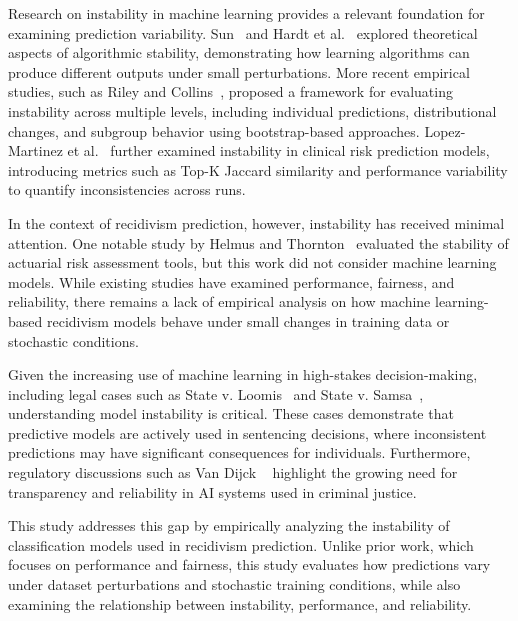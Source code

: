 \documentclass[12pt]{article}
\begin{document}
Research on instability in machine learning provides a relevant foundation for examining prediction variability. Sun~\cite{sun2015stability} and Hardt et al.~\cite{hardt2016train} explored theoretical aspects of algorithmic stability, demonstrating how learning algorithms can produce different outputs under small perturbations. More recent empirical studies, such as Riley and Collins~\cite{riley2023stability}, proposed a framework for evaluating instability across multiple levels, including individual predictions, distributional changes, and subgroup behavior using bootstrap-based approaches. Lopez-Martinez et al.~\cite{lopez2022instability} further examined instability in clinical risk prediction models, introducing metrics such as Top-K Jaccard similarity and performance variability to quantify inconsistencies across runs.

In the context of recidivism prediction, however, instability has received minimal attention. One notable study by Helmus and Thornton~\cite{helmus2015stability} evaluated the stability of actuarial risk assessment tools, but this work did not consider machine learning models. While existing studies have examined performance, fairness, and reliability, there remains a lack of empirical analysis on how machine learning-based recidivism models behave under small changes in training data or stochastic conditions.

Given the increasing use of machine learning in high-stakes decision-making, including legal cases such as State v. Loomis~\cite{loomis2016} and State v. Samsa~\cite{samsa2014}, understanding model instability is critical. These cases demonstrate that predictive models are actively used in sentencing decisions, where inconsistent predictions may have significant consequences for individuals. Furthermore, regulatory discussions such as Van Dijck ~\cite{van2022predicting} highlight the growing need for transparency and reliability in AI systems used in criminal justice.

This study addresses this gap by empirically analyzing the instability of classification models used in recidivism prediction. Unlike prior work, which focuses on performance and fairness, this study evaluates how predictions vary under dataset perturbations and stochastic training conditions, while also examining the relationship between instability, performance, and reliability.
\end{document}
